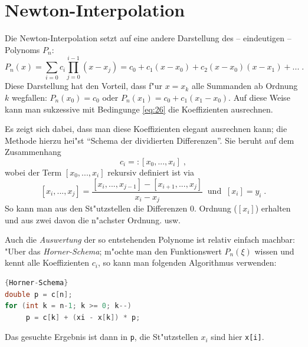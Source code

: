 \documentclass[a4paper]{book}
\newcommand{\abs}{\bigskip \noindent}
\begin{document}





\section{Newton-Interpolation}
\label{sec:newton_interpolation}

Die Newton-Interpolation setzt auf eine andere Darstellung des --
eindeutigen -- Polynoms $P_n$:
\begin{equation}
  \label{eq:32}
  P_n(x) = \sum_{i=0} c_i \prod_{j = 0}^{i-1} (x-x_j) = c_0 +
  c_1(x-x_0) + c_2 (x-x_0)(x-x_1) + ... \;.
\end{equation}
Diese Darstellung hat den Vorteil, dass f"ur $x = x_k$ alle Summanden
ab Ordnung $k$ wegfallen: $P_n(x_0) = c_0$ oder $P_n(x_1) = c_0 +
c_1(x_1-x_0)$.
Auf diese Weise kann man sukzessive mit Bedingunge \eqref{eq:26} die
Koeffizienten ausrechnen. 

Es zeigt sich dabei, dass man diese Koeffizienten elegant ausrechnen
kann; die Methode hierzu hei"st "`Schema der dividierten
Differenzen"'. Sie beruht auf dem Zusammenhang
\begin{equation}
  \label{eq:33}
  c_i =: [x_0, ..., x_i] \;,
\end{equation}
wobei der Term $[x_0, ..., x_i]$ rekursiv definiert ist via
\begin{equation}
  \label{eq:34}
  [x_i, ..., x_j] = \frac{[x_i, ..., x_{j-1}] - [x_{i+1}, ...,
    x_j]}{x_i - x_j} ~ \text{ und } ~ [x_i] = y_i \;.
\end{equation}
So kann man aus den St"utzstellen die Differenzen 0. Ordnung ($[x_i]$)
erhalten und aus zwei davon die n"achster Ordnung. usw.

\abs
Auch die \emph{Auswertung} der so entstehenden Polynome ist relativ
einfach machbar: "Uber das \emph{Horner-Schema}; m"ochte man den
Funktionswert $P_n(\xi)$ wissen und kennt alle Koeffizienten $c_i$, so
kann man folgenden Algorithmus verwenden:
\begin{lstlisting}[caption=Horner-Schema,language=c++]{Horner-Schema}
double p = c[n];
for (int k = n-1; k >= 0; k--)
     p = c[k] + (xi - x[k]) * p;
\end{lstlisting}
Das gesuchte Ergebnis ist dann in \lstinline|p|, die St"utzstellen
$x_i$ sind hier \lstinline|x[i]|.
\end{document}
